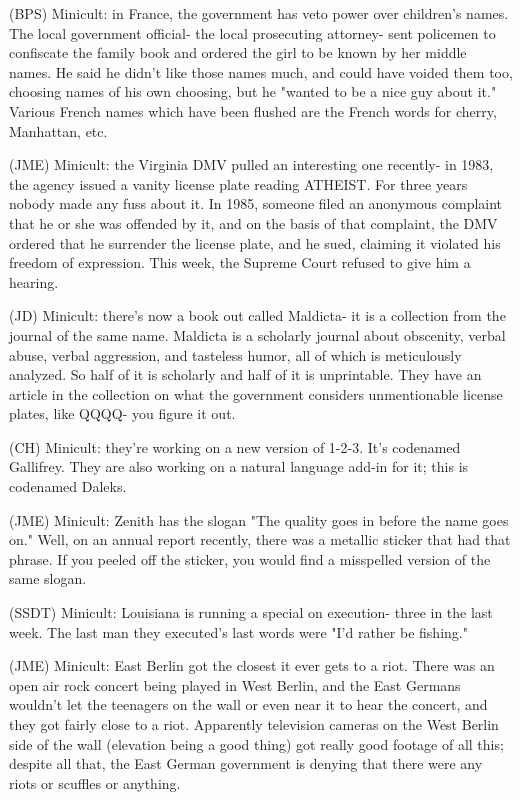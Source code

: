 \documentclass[12pt]{article}
\begin{document}
(BPS) Minicult: in France, the government has veto power over children's names. The local government official- the local prosecuting attorney- sent policemen to confiscate the family book and ordered the girl to be known by her middle names. He said he didn't like those names much, and could have voided them too, choosing names of his own choosing, but he "wanted to be a nice guy about it." Various French names which have been flushed are the French words for cherry, Manhattan, etc.

(JME) Minicult: the Virginia DMV pulled an interesting one recently- in 1983, the agency issued a vanity license plate reading ATHEIST. For three years nobody made any fuss about it. In 1985, someone filed an anonymous complaint that he or she was offended by it, and on the basis of that complaint, the DMV ordered that he surrender the license plate, and he sued, claiming it violated his freedom of expression. This week, the Supreme Court refused to give him a hearing.

(JD) Minicult: there's now a book out called Maldicta- it is a collection from the journal of the same name. Maldicta is a scholarly journal about obscenity, verbal abuse, verbal aggression, and tasteless humor, all of which is meticulously analyzed. So half of it is scholarly and half of it is unprintable. They have an article in the collection on what the government considers unmentionable license plates, like QQQQ- you figure it out.

(CH) Minicult: they're working on a new version of 1-2-3. It's codenamed Gallifrey. They are also working on a natural language add-in for it; this is codenamed Daleks.

(JME) Minicult: Zenith has the slogan "The quality goes in before the name goes on." Well, on an annual report recently, there was a metallic sticker that had that phrase. If you peeled off the sticker, you would find a misspelled version of the same slogan.

(SSDT) Minicult: Louisiana is running a special on execution- three in the last week. The last man they executed's last words were "I'd rather be fishing."

(JME) Minicult: East Berlin got the closest it ever gets to a riot. There was an open air rock concert being played in West Berlin, and the East Germans wouldn't let the teenagers on the wall or even near it to hear the concert, and they got fairly close to a riot. Apparently television cameras on the West Berlin side of the wall (elevation being a good thing) got really good footage of all this; despite all that, the East German government is denying that there were any riots or scuffles or anything.
\end{document}
